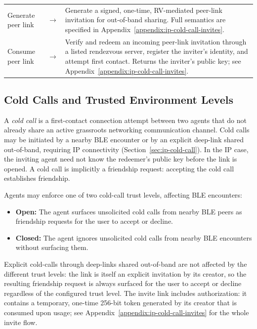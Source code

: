 \begin{longtable}{L{4cm} L{5cm} L{5cm}}
Generate peer link &  $\to$  & Generate a signed, one-time, RV-mediated peer-link invitation for out-of-band sharing.  Full semantics are specified in Appendix~\ref{appendix:ip-cold-call-invites}. \\
Consume peer link &  $\to$  & Verify and redeem an incoming peer-link invitation through a listed rendezvous server, register the inviter's identity, and attempt first contact.  Returns the inviter's public key; see Appendix~\ref{appendix:ip-cold-call-invites}. \\
\bottomrule
\end{longtable}
\subsection{Cold Calls and Trusted Environment Levels}
\label{sec:cold-call-trust}
A \emph{cold call} is a first-contact connection attempt between two agents that do not already share an active grassroots networking communication channel. Cold calls may be initiated by a nearby BLE encounter or by an explicit deep-link shared out-of-band, requiring IP connectivity (Section~\ref{sec:ip-cold-call}).  In the IP case, the inviting agent need not know the redeemer's public key before the link is opened.  A cold call is implicitly a friendship request: accepting the cold call establishes friendship.

Agents may enforce one of two cold-call trust levels, affecting BLE encounters:
\begin{itemize}
\item \textbf{Open:} The agent surfaces unsolicited cold calls from nearby BLE peers as friendship requests for the user to accept or decline.
\item \textbf{Closed:} The agent ignores unsolicited cold calls from nearby BLE encounters without surfacing them.
\end{itemize}
Explicit cold-calls through deep-links shared out-of-band are not affected by the different trust levels: the link is itself an explicit invitation by its creator, so the resulting friendship request is always surfaced for the user to accept or decline regardless of the configured trust level.  The invite link includes authorization: it contains a temporary, one-time 256-bit token generated by its creator that is consumed upon usage; see Appendix~\ref{appendix:ip-cold-call-invites} for the whole invite flow.

